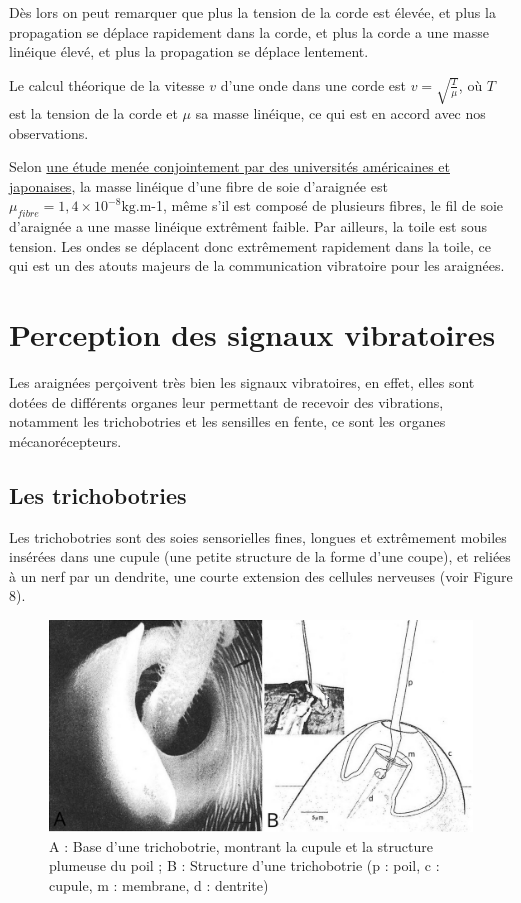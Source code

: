 Dès lors on peut remarquer que plus la tension de la corde est élevée,
et plus la propagation se déplace rapidement dans la corde, et plus la
corde a une masse linéique élevé, et plus la propagation se déplace
lentement.

Le calcul théorique de la vitesse \(v\) d'une onde dans une corde est
\(v = \sqrt{\frac{T}{\mu}}\), où \(T\) est la tension de la corde et
\(\mu\) sa masse linéique, ce qui est en accord avec nos observations.

Selon
\href{http://web.mit.edu/course/3/3.064/www/slides/Ko_spider_silk.pdf}{une
étude menée conjointement par des universités américaines et
japonaises}, la masse linéique d'une fibre de soie d'araignée est
\(\mu_{fibre} = 1,4\times10^{-8} \text{kg.m}\)-1, même s'il est composé
de plusieurs fibres, le fil de soie d'araignée a une masse linéique
extrêment faible. Par ailleurs, la toile est sous tension. Les ondes se
déplacent donc extrêmement rapidement dans la toile, ce qui est un des
atouts majeurs de la communication vibratoire pour les araignées.

\section{Perception des signaux vibratoires}

Les araignées perçoivent très bien les signaux vibratoires, en effet,
elles sont dotées de différents organes leur permettant de recevoir des
vibrations, notamment les trichobotries et les sensilles en fente, ce
sont les organes mécanorécepteurs.

\subsection{Les trichobotries}

Les trichobotries sont des soies sensorielles fines, longues et
extrêmement mobiles insérées dans une cupule (une petite structure de la
forme d'une coupe), et reliées à un nerf par un dendrite, une courte
extension des cellules nerveuses (voir Figure 8).

\begin{figure}[htb!]
	\centering
	\includegraphics[width=0.7\linewidth]{../img/vibrations/trichobotrie}
	\caption{A : Base d'une trichobotrie, montrant la cupule et
		la structure plumeuse du poil ; B : Structure d'une trichobotrie (p :
		poil, c : cupule, m : membrane, d : dentrite)}
	\label{fig:trichobotrie}
\end{figure}


